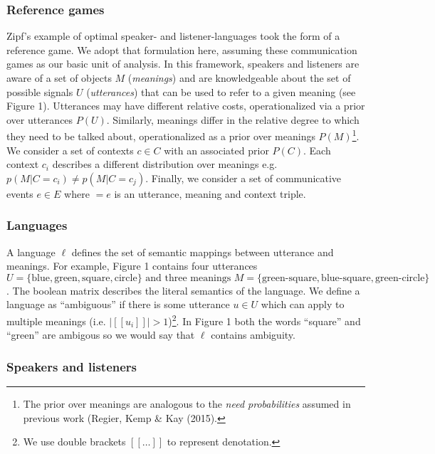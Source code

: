 \documentclass[10pt, letterpaper]{article}
\begin{document}
\subsubsection{Reference games}\label{reference-games}

Zipf's example of optimal speaker- and listener-languages took the form
of a reference game. We adopt that formulation here, assuming these
communication games as our basic unit of analysis. In this framework,
speakers and listeners are aware of a set of objects \(M\)
(\emph{meanings}) and are knowledgeable about the set of possible
signals \(U\) (\emph{utterances}) that can be used to refer to a given
meaning (see Figure 1). Utterances may have different relative costs,
operationalized via a prior over utterances \(P(U)\). Similarly,
meanings differ in the relative degree to which they need to be talked
about, operationalized as a prior over meanings
\(P(M)\)\footnote{The prior over meanings are analogous to the \textit{need probabilities} assumed in previous work (Regier, Kemp \& Kay (2015).}.
We consider a set of contexts \(c\in C\) with an associated prior
\(P(C)\). Each context \(c_i\) describes a different distribution over
meanings e.g. \(p(M|C=c_i) \neq p(M|C=c_j)\). Finally, we consider a set
of communicative events \(e \in E\) where \(<u, m, c> = e\) is an
utterance, meaning and context triple.\par

\subsubsection{Languages}\label{languages}

A language \(\ell\) defines the set of semantic mappings between
utterance and meanings. For example, Figure 1 contains four utterances
\(U = \{\text{blue}, \text{green}, \text{square}, \text{circle}\} \text{ and three meanings }M = \{\text{green-square}, \text{blue-square}, \text{green-circle}\}\).
The boolean matrix describes the literal semantics of the language. We
define a language as ``ambiguous'' if there is some utterance
\(u \in U\) which can apply to multiple meanings (i.e.
\(|[[u_i]]| > 1\))\footnote{We use double brackets $[[\dots]]$ to represent denotation.}.
In Figure 1 both the words ``square'' and ``green'' are ambigous so we
would say that \(\ell\) contains ambiguity.

\subsubsection{Speakers and listeners}\label{speakers-and-listeners}
\end{document}
